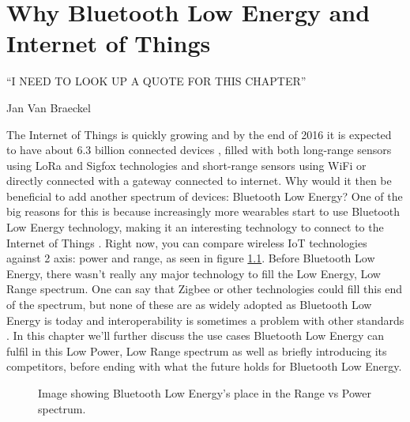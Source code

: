 \documentclass[pdftex,a4paper,12pt,twoside]{report}
\begin{document}
\chapter{Why Bluetooth Low Energy and Internet of Things}
\label{ch:BLEIOT}
\epigraph{``I NEED TO LOOK UP A QUOTE FOR THIS CHAPTER''}{Jan Van Braeckel}
The Internet of Things is quickly growing and by the end of 2016 it is expected to have about 6.3 billion connected devices \citep{gartner2015}, filled with both long-range sensors using LoRa and Sigfox technologies and short-range sensors using WiFi or directly connected with a gateway connected to internet. Why would it then be beneficial to add another spectrum of devices: Bluetooth Low Energy? One of the big reasons for this is because increasingly more wearables start to use Bluetooth Low Energy technology, making it an interesting technology to connect to the Internet of Things \citep{wei2014wearables}. Right now, you can compare wireless IoT technologies against 2 axis: power and range, as seen in figure \ref{fig:powerrange}. Before Bluetooth Low Energy, there wasn't really any major technology to fill the Low Energy, Low Range spectrum. One can say that Zigbee or other technologies could fill this end of the spectrum, but none of these are as widely adopted as Bluetooth Low Energy is today and interoperability is sometimes a problem with other standards \citep{colitti2014}. In this chapter we'll further discuss the use cases Bluetooth Low Energy can fulfil in this Low Power, Low Range spectrum as well as briefly introducing its competitors, before ending with what the future holds for Bluetooth Low Energy.

\begin{figure}[h]
\centering
{} 

\caption{Image showing Bluetooth Low Energy's place in the Range vs Power spectrum.}
\label{fig:powerrange}

\end{figure}
\end{document}
